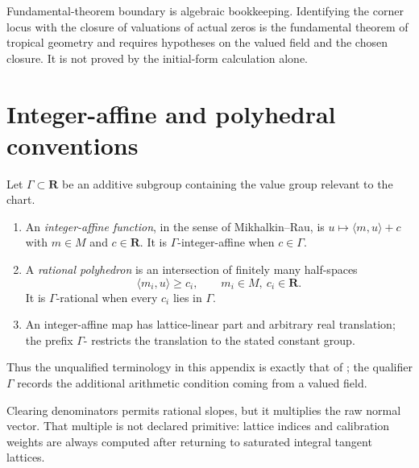 \begin{warning}{Fundamental-theorem boundary}
\label{warn:appG-fundamental-boundary}
 is algebraic bookkeeping.
Identifying the corner locus with the closure of valuations of actual zeros
is the fundamental theorem of tropical geometry and requires hypotheses on
the valued field and the chosen closure.
It is not proved by the initial-form calculation alone.
\end{warning}

\section{Integer-affine and polyhedral conventions}
\label{sec:appG-polyhedra}

Let \(\Gamma\subset\mathbf R\) be an additive subgroup containing the value
group relevant to the chart.

\begin{definition}
\label{def:appG-affine-conventions}
\begin{enumerate}
\item An \emph{integer-affine function}, in the sense of
      Mikhalkin--Rau, is
      \(u\mapsto\langle m,u\rangle+c\) with \(m\in M\) and
      \(c\in\mathbf R\).  It is \(\Gamma\)-integer-affine when
      \(c\in\Gamma\).
\item A \emph{rational polyhedron} is an intersection of finitely many
      half-spaces
      \[
                         \langle m_i,u\rangle\geq c_i,
                         \qquad m_i\in M,\ c_i\in\mathbf R.
\tag{G.19}\label{eq:appG-polyhedron}
      \]
      It is \(\Gamma\)-rational when every \(c_i\) lies in \(\Gamma\).
\item An integer-affine map has lattice-linear part and arbitrary real
      translation; the prefix \(\Gamma\)- restricts the translation to the
      stated constant group.
\end{enumerate}
\end{definition}

Thus the unqualified terminology in this appendix is exactly that of
\cite[\S\S1.3 and 2.1]{MR18Tropical}; the qualifier \(\Gamma\) records the
additional arithmetic condition coming from a valued field.

Clearing denominators permits rational slopes, but it multiplies the raw
normal vector.  That multiple is not declared primitive: lattice indices
and calibration weights are always computed after returning to saturated
integral tangent lattices.

